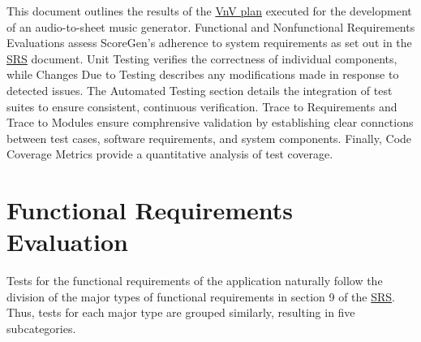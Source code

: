 \documentclass[12pt, titlepage]{article}
\begin{document}
\tableofcontents

\listoftables %

\newpage


This document outlines the results of the 
\href{https://github.com/emilyperica/ScoreGen/blob/main/docs/VnVPlan/VnVPlan.pdf}{VnV plan}
executed for the development of an audio-to-sheet music generator. 
Functional and Nonfunctional Requirements Evaluations assess ScoreGen's 
adherence to system requirements as set out in the \href{https://github.com/emilyperica/ScoreGen/blob/main/docs/SRS-Volere/SRS.pdf}{SRS} document. 
Unit Testing verifies the correctness of individual components, while Changes 
Due to Testing describes any modifications made in response to detected issues. 
The Automated Testing section details the integration of test suites to ensure 
consistent, continuous verification. Trace to Requirements and Trace to Modules 
ensure comphrensive validation by establishing clear connctions between test 
cases, software requirements, and system components. Finally, Code Coverage Metrics 
provide a quantitative analysis of test coverage.

\section{Functional Requirements Evaluation}
\label{fr}
Tests for the functional requirements of the application naturally follow the division of the major types of functional requirements
in section 9 of the \href{https://github.com/emilyperica/ScoreGen/blob/main/docs/SRS-Volere/SRS.pdf}{SRS}. Thus, tests for each major 
type are grouped similarly, resulting in five subcategories.
\end{document}
